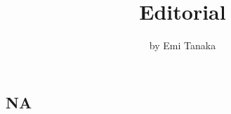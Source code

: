 \title{Editorial}


\author{by Emi Tanaka}

\maketitle


\subsection{NA}\label{na}


\address{%
Emi Tanaka\\
Australian National University\\%
\\
%
\url{https://journal.r-project.org}\\%
%
\href{mailto:r-journal@r-project.org}{\nolinkurl{r-journal@r-project.org}}%
}
